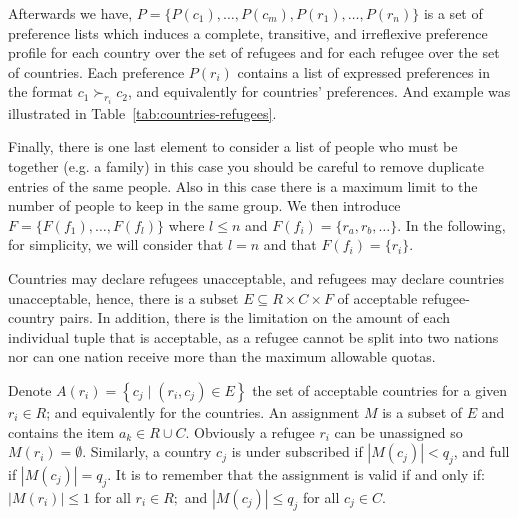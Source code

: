 \documentclass[letterpaper]{article} %
\begin{document}
    Afterwards we have, \(P = \{P(c_1), \dots , P(c_m), P(r_1), \dots , P(r_n)\}\) is
    a set of preference lists which induces a complete, transitive, and irreflexive preference profile for each
    country over the set of refugees and for each refugee over the set of countries.
    Each preference \(P(r_i)\) contains a list of expressed preferences in the format
    \( c _ { 1 } \succ_{r _ { i }} c _ { 2 } \),
    and equivalently for countries' preferences.
    And example was illustrated in Table~\ref{tab:countries-refugees}.

    Finally, there is one last element to consider a list of people who must be together (e.g. a family)
    in this case you should be careful to remove duplicate entries of the same people.
    Also in this case there is a maximum limit to the number of people to keep in the same group.
    We then introduce \(F=\{F(f_1), \dots, F(f_l)\}\) where \(l\leq n\) and \(F(f_i) = \{r_a, r_b, \dots\}\).
    In the following, for simplicity, we will consider that \(l=n\) and that \(F(f_i)=\{r_i\}\).

    Countries may declare refugees unacceptable, and refugees may declare countries unacceptable,
    hence, there is a subset \(E \subseteq R \times C \times F\) of acceptable refugee-country pairs.
    In addition, there is the limitation on the amount of each individual tuple that is acceptable, as a refugee cannot
    be split into two nations nor can one nation receive more than the maximum allowable quotas.

    Denote \( A \left( r _ { i } \right) = \left\{ c _ { j } \mid \left( r _ { i } , c _ { j } \right) \in E \right\} \)
    the set of acceptable countries for a given \( r _ { i } \in R \); and equivalently for the countries.
    An assignment \(M\) is a subset of \(E\) and contains the item \( a _ { k } \in R \cup C \).
    Obviously a refugee \( r _ { i } \) can be unassigned so \( M \left( r _ { i } \right) = \emptyset \).
    Similarly, a country \( c _ { j } \) is
    under subscribed if \( \left| M \left( c _ { j } \right) \right| < q _ { j } \), and full if
    \( \left| M \left( c _ { j } \right) \right| = q _ { j } \).
    It is to remember that the assignment is valid if and only if:
    \( \left| M \left( r _ { i } \right) \right| \leq 1 \) for all \( r _ { i } \in R ; \) and
    \( \left| M \left( c _ { j } \right) \right| \leq q _ { j } \) for all \( c _ { j } \in C  \).
\end{document}
